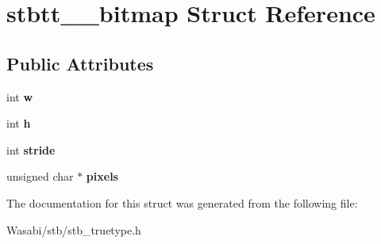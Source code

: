\hypertarget{structstbtt____bitmap}{}\section{stbtt\+\_\+\+\_\+bitmap Struct Reference}
\label{structstbtt____bitmap}
\subsection*{Public Attributes}
\begin{DoxyCompactItemize}
\item 
int {\bfseries w}\hypertarget{structstbtt____bitmap_afbd607426f0a457b1a871ed902eeb926}{}\label{structstbtt____bitmap_afbd607426f0a457b1a871ed902eeb926}

\item 
int {\bfseries h}\hypertarget{structstbtt____bitmap_a2afc802e26e9f1dda897ac16ecfff10e}{}\label{structstbtt____bitmap_a2afc802e26e9f1dda897ac16ecfff10e}

\item 
int {\bfseries stride}\hypertarget{structstbtt____bitmap_a48ee6b550ee4f1d85bfc32c62c0e9a98}{}\label{structstbtt____bitmap_a48ee6b550ee4f1d85bfc32c62c0e9a98}

\item 
unsigned char $\ast$ {\bfseries pixels}\hypertarget{structstbtt____bitmap_ae6be77625faf55b110eaaffde5c7733c}{}\label{structstbtt____bitmap_ae6be77625faf55b110eaaffde5c7733c}

\end{DoxyCompactItemize}


The documentation for this struct was generated from the following file\+:\begin{DoxyCompactItemize}
\item 
Wasabi/stb/stb\+\_\+truetype.\+h\end{DoxyCompactItemize}
